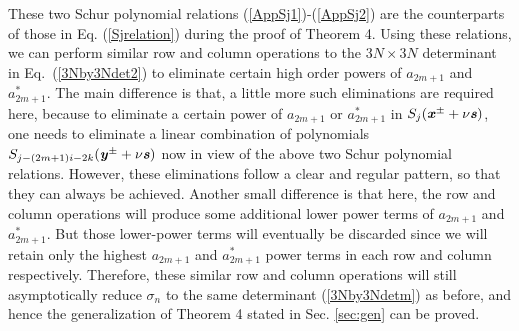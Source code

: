 \documentclass[amsmath,amssymb]{revtex4}
\begin{document}
These two Schur polynomial relations (\ref{AppSj1})-(\ref{AppSj2}) are the counterparts of those in Eq. (\ref{Sjrelation}) during the proof of Theorem 4. Using these relations, we can perform similar row and column operations to the $3N\times 3N$ determinant in Eq.~(\ref{3Nby3Ndet2}) to eliminate certain high order powers of $a_{2m+1}$ and $a_{2m+1}^*$. The main difference is that, a little more such eliminations are required here, because to eliminate a certain power of $a_{2m+1}$ or $a_{2m+1}^*$ in $S_{j}(\textbf{\emph{x}}^{\pm}+\nu\textbf{\emph{s}})$, one needs to eliminate a linear combination of polynomials $S_{j-(2m+1)i-2k}(\textbf{\emph{y}}^{\pm}+\nu\textbf{\emph{s}})$ now in view of the above two Schur polynomial relations. However, these eliminations follow a clear and regular pattern, so that they can always be achieved. Another small difference is that here, the row and column operations will produce some additional lower power terms of $a_{2m+1}$ and $a_{2m+1}^*$. But those lower-power terms will eventually be discarded since we will retain only the highest $a_{2m+1}$ and $a_{2m+1}^*$ power terms in each row and column respectively. Therefore, these similar row and column operations will still asymptotically reduce $\sigma_n$ to the same determinant (\ref{3Nby3Ndetm}) as before, and hence the generalization of Theorem 4 stated in Sec. \ref{sec:gen} can be proved.
\end{document}
